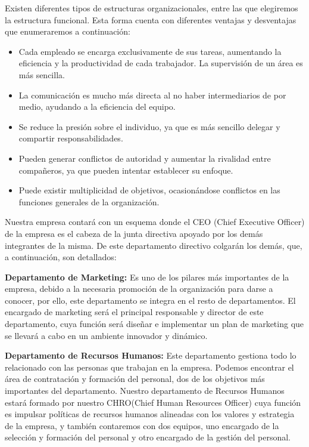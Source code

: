 Existen diferentes tipos de estructuras organizacionales, entre las que elegiremos la estructura funcional. Esta forma cuenta con diferentes ventajas y desventajas que enumeraremos a continuación:

\begin{itemize}
    \item Cada empleado se encarga exclusivamente de sus tareas, aumentando la eficiencia y la productividad de cada trabajador.
    La supervisión de un área es más sencilla.
    \item La comunicación es mucho más directa al no haber intermediarios de por medio, ayudando a la eficiencia del equipo.
    \item Se reduce la presión sobre el individuo, ya que es más sencillo delegar y compartir responsabilidades.
    \item Pueden generar conflictos de autoridad y aumentar la rivalidad entre compañeros, ya que pueden intentar establecer su enfoque.
    \item Puede existir multiplicidad de objetivos, ocasionándose conflictos en las funciones generales de la organización.    
\end{itemize}

Nuestra empresa contará con un esquema donde el CEO (Chief Executive Officer) de la empresa es el cabeza de la junta directiva apoyado por los demás integrantes de la misma. De este departamento directivo colgarán los demás, que, a continuación, son detallados:

\textbf{Departamento de Marketing:} Es uno de los pilares más importantes de la empresa, debido a la necesaria promoción de la organización para darse a conocer, por ello, este departamento se integra en el resto de departamentos. El encargado de marketing será el principal responsable y director de este departamento, cuya función será diseñar e implementar un plan de marketing que se llevará a cabo en un ambiente innovador y dinámico.

\textbf{Departamento de Recursos Humanos:} Este departamento gestiona todo lo relacionado con las personas que trabajan en la empresa. Podemos encontrar el área de contratación y formación del personal, dos de los objetivos más importantes del departamento. Nuestro departamento de Recursos Humanos estará formado por nuestro CHRO(Chief Human Resources Officer) cuya función es impulsar políticas de recursos humanos alineadas con los valores y estrategia de la empresa, y también contaremos con dos equipos, uno encargado de la selección y formación del personal y otro encargado de la gestión del personal.

